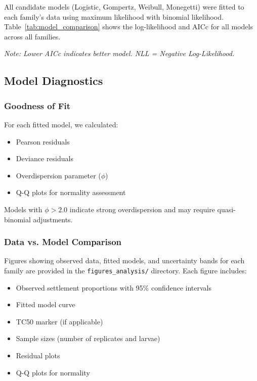 \documentclass[11pt]{article}
\begin{document}
All candidate models (Logistic, Gompertz, Weibull, Monegetti) were fitted to each family's data using maximum likelihood with binomial likelihood. Table~\ref{tab:model_comparison} shows the log-likelihood and AICc for all models across all families.

\begin{table}[H]
    \centering
    \caption{Model Comparison: Log-Likelihood and AICc for All Families}
    \label{tab:model_comparison}
    \footnotesize
    
    \vspace{0.2cm}
    \textit{Note: Lower AICc indicates better model. NLL = Negative Log-Likelihood.}
\end{table}

\subsection{Model Diagnostics}

\subsubsection{Goodness of Fit}

For each fitted model, we calculated:
\begin{itemize}
    \item Pearson residuals
    \item Deviance residuals
    \item Overdispersion parameter ($\phi$)
    \item Q-Q plots for normality assessment
\end{itemize}

Models with $\phi > 2.0$ indicate strong overdispersion and may require quasi-binomial adjustments.

\subsubsection{Data vs. Model Comparison}

Figures showing observed data, fitted models, and uncertainty bands for each family are provided in the \texttt{figures\_analysis/} directory. Each figure includes:
\begin{itemize}
    \item Observed settlement proportions with 95\% confidence intervals
    \item Fitted model curve
    \item TC50 marker (if applicable)
    \item Sample sizes (number of replicates and larvae)
    \item Residual plots
    \item Q-Q plots for normality
\end{itemize}
\end{document}

